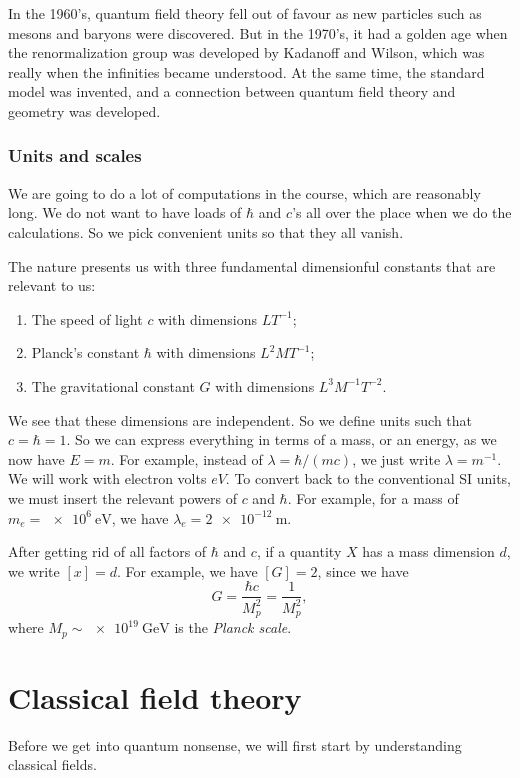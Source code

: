 \documentclass[a4paper]{article}
\begin{document}
In the 1960's, quantum field theory fell out of favour as new particles such as mesons and baryons were discovered. But in the 1970's, it had a golden age when the renormalization group was developed by Kadanoff and Wilson, which was really when the infinities became understood. At the same time, the standard model was invented, and a connection between quantum field theory and geometry was developed.

\subsubsection*{Units and scales}
We are going to do a lot of computations in the course, which are reasonably long. We do not want to have loads of $\hbar$ and $c$'s all over the place when we do the calculations. So we pick convenient units so that they all vanish.

The nature presents us with three fundamental dimensionful constants that are relevant to us:
\begin{enumerate}
  \item The speed of light $c$ with dimensions $LT^{-1}$;
  \item Planck's constant $\hbar$ with dimensions $L^2 MT^{-1}$;
  \item The gravitational constant $G$ with dimensions $L^3 M^{-1} T^{-2}$.
\end{enumerate}
We see that these dimensions are independent. So we define units such that $c = \hbar = 1$. So we can express everything in terms of a mass, or an energy, as we now have $E = m$. For example, instead of $\lambda = \hbar/(mc)$, we just write $\lambda = m^{-1}$. We will work with electron volts $eV$. To convert back to the conventional SI units, we must insert the relevant powers of $c$ and $\hbar$. For example, for a mass of $m_e = \SI{e6}\electronvolt$, we have $\lambda_e = \SI{2e-12}{\meter}$.

After getting rid of all factors of $\hbar$ and $c$, if a quantity $X$ has a mass dimension $d$, we write $[x] = d$. For example, we have $[G] = 2$, since we have
\[
  G = \frac{\hbar c}{M_p^2} = \frac{1}{M_p^2},
\]
where $M_p \sim \SI{e19}{\giga\electronvolt}$ is the \emph{Planck scale}.

\section{Classical field theory}
Before we get into quantum nonsense, we will first start by understanding classical fields.
\end{document}
